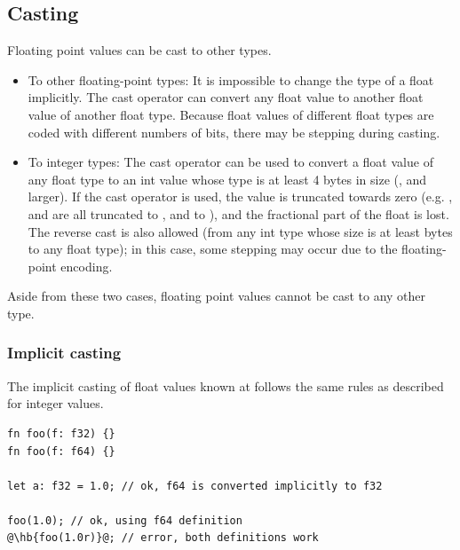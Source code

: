 \subsection{Casting}
\label{sec:org9eacb07}

Floating point values can be cast to other types.

\begin{itemize}
  \setlength\itemsep{-4pt}
\item To other floating-point types: It is impossible to change the type of a
  float implicitly. The cast operator  can convert any float
  value to another float value of another float type. Because float values of
  different float types are coded with different numbers of bits, there may be
  stepping during casting.

\item To integer types: The cast operator can be used to convert a float value
  of any float type to an int value whose type is at least 4 bytes in size
  (,  and larger). If the cast operator is used, the
  value is truncated towards zero (e.g. ,  and
   are all truncated to , and  to ),
  and the fractional part of the float is lost. The reverse cast is also allowed (from
  any int type whose size is at least  bytes to any float type); in
  this case, some stepping may occur due to the floating-point encoding.

\end{itemize}

Aside from these two cases, floating point values cannot be cast to any other
type.

\subsubsection{Implicit casting}

The implicit casting of float values known at  follows the same
rules as described for integer  values.

\begin{lstlisting}[style=coloredverbatimError, escapechar=@]
fn foo(f: f32) {}
fn foo(f: f64) {}

let a: f32 = 1.0; // ok, f64 is converted implicitly to f32

foo(1.0); // ok, using f64 definition
@\hb{foo(1.0r)}@; // error, both definitions work
\end{lstlisting}


